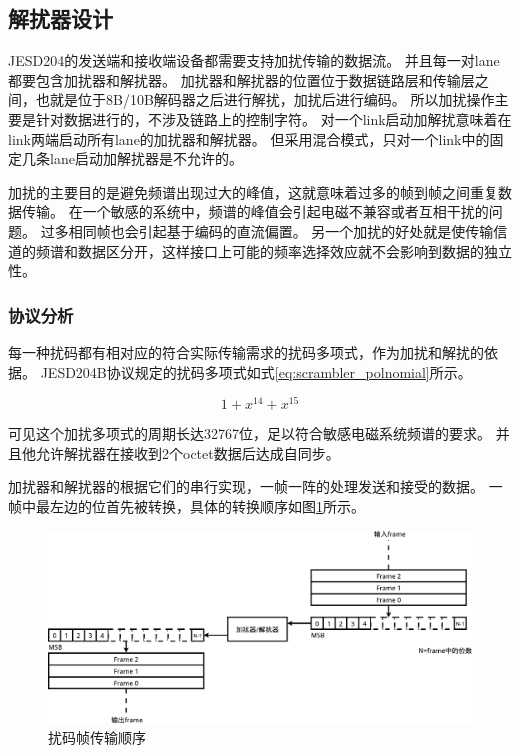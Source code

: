 \documentclass[UTF8]{ctexart}
\begin{document}
\subsection{解扰器设计}

JESD204的发送端和接收端设备都需要支持加扰传输的数据流。
并且每一对lane都要包含加扰器和解扰器。
加扰器和解扰器的位置位于数据链路层和传输层之间，也就是位于8B/10B解码器之后进行解扰，加扰后进行编码。
所以加扰操作主要是针对数据进行的，不涉及链路上的控制字符。
对一个link启动加解扰意味着在link两端启动所有lane的加扰器和解扰器。
但采用混合模式，只对一个link中的固定几条lane启动加解扰器是不允许的。

加扰的主要目的是避免频谱出现过大的峰值，这就意味着过多的帧到帧之间重复数据传输。
在一个敏感的系统中，频谱的峰值会引起电磁不兼容或者互相干扰的问题。
过多相同帧也会引起基于编码的直流偏置。
另一个加扰的好处就是使传输信道的频谱和数据区分开，这样接口上可能的频率选择效应就不会影响到数据的独立性。

\subsubsection{协议分析}

每一种扰码都有相对应的符合实际传输需求的扰码多项式，作为加扰和解扰的依据。
JESD204B协议规定的扰码多项式如式\ref{eq:scrambler_polnomial}所示。

\begin{equation}
\label{eq:scrambler_polnomial}
1+x^{14}+x^{15}
\end{equation}

可见这个加扰多项式的周期长达32767位，足以符合敏感电磁系统频谱的要求。
并且他允许解扰器在接收到2个octet数据后达成自同步。

加扰器和解扰器的根据它们的串行实现，一帧一阵的处理发送和接受的数据。
一帧中最左边的位首先被转换，具体的转换顺序如图\ref{fig:serial_scrambling}所示。

\begin{figure}[H]
\centering
\includegraphics[width=18cm]{./img/serial_scrambling.pdf}
\caption{扰码帧传输顺序}
\label{fig:serial_scrambling}
\end{figure}
\end{document}
